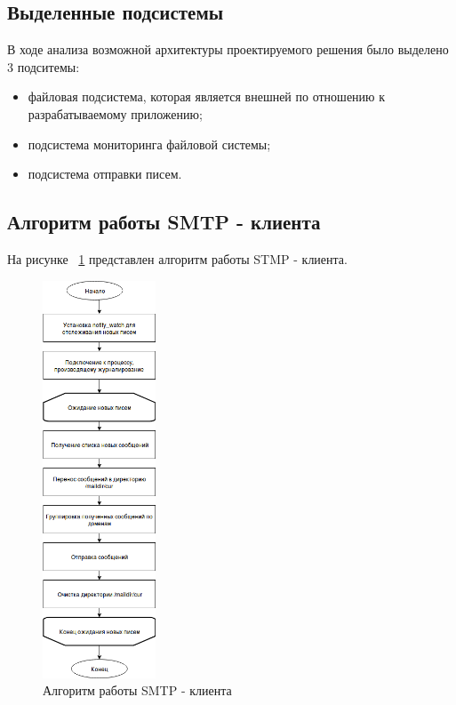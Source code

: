 \documentclass[a4paper,12pt]{article}
\begin{document}
\subsection{Выделенные подсистемы}

В ходе анализа возможной архитектуры проектируемого решения было выделено 3 подситемы:

\begin{itemize}
\item файловая подсистема, которая является внешней по отношению к разрабатываемому приложению;
\item подсистема мониторинга файловой системы;
\item подсистема отправки писем.
\end{itemize}

\subsection{Алгоритм работы SMTP - клиента}

На рисунке ~\ref{fig:alg_smtp} представлен алгоритм работы STMP - клиента.

\begin{figure}[h]
\centering
\includegraphics[width=0.3\textwidth]{includes/alg_smpt.png}
\caption{Алгоритм работы SMTP - клиента}
\label{fig:alg_smtp}
\end{figure}
\end{document}
